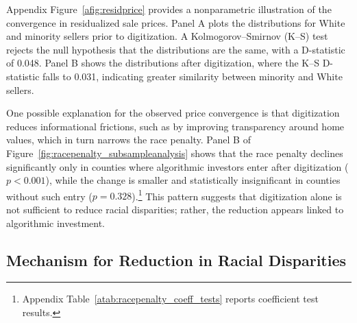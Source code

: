 \documentclass[11pt]{article}
\begin{document}
Appendix Figure~\ref{afig:residprice} provides a nonparametric illustration of the convergence in residualized sale prices. Panel A plots the distributions for White and minority sellers prior to digitization. A Kolmogorov–Smirnov (K–S) test rejects the null hypothesis that the distributions are the same, with a D-statistic of 0.048. Panel B shows the distributions after digitization, where the K–S D-statistic falls to 0.031, indicating greater similarity between minority and White sellers. 

One possible explanation for the observed price convergence is that digitization reduces informational frictions, such as by improving transparency around home values, which in turn narrows the race penalty. Panel B of Figure~\ref{fig:racepenalty_subsampleanalysis} shows that the race penalty declines significantly only in counties where algorithmic investors enter after digitization ($p < 0.001$), while the change is smaller and statistically insignificant in counties without such entry ($p = 0.328$).\footnote{Appendix Table~\ref{atab:racepenalty_coeff_tests} reports coefficient test results.} This pattern suggests that digitization alone is not sufficient to reduce racial disparities; rather, the reduction appears linked to algorithmic investment.



\subsection{Mechanism for Reduction in Racial Disparities}
\end{document}
